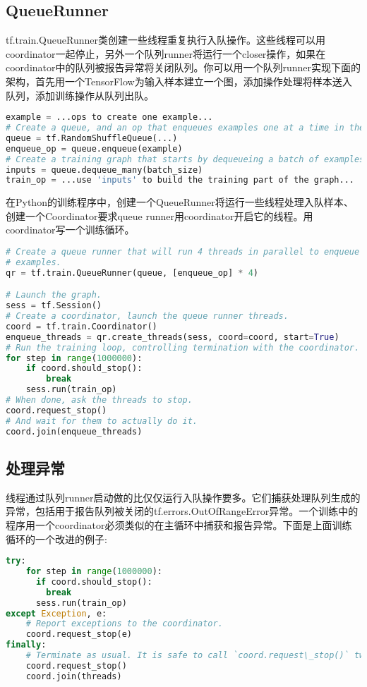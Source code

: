\subsection{QueueRunner}
tf.train.QueueRunner类创建一些线程重复执行入队操作。这些线程可以用coordinator一起停止，另外一个队列runner将运行一个closer操作，如果在coordinator中的队列被报告异常将关闭队列。你可以用一个队列runner实现下面的架构，首先用一个TensorFlow为输入样本建立一个图，添加操作处理将样本送入队列，添加训练操作从队列出队。
\begin{lstlisting}[language=Python]
example = ...ops to create one example...
# Create a queue, and an op that enqueues examples one at a time in the queue.
queue = tf.RandomShuffleQueue(...)
enqueue_op = queue.enqueue(example)
# Create a training graph that starts by dequeueing a batch of examples.
inputs = queue.dequeue_many(batch_size)
train_op = ...use 'inputs' to build the training part of the graph...	
\end{lstlisting}
在Python的训练程序中，创建一个QueueRunner将运行一些线程处理入队样本、创建一个Coordinator要求queue runner用coordinator开启它的线程。用coordinator写一个训练循环。
\begin{lstlisting}[language=Python]
# Create a queue runner that will run 4 threads in parallel to enqueue
# examples.
qr = tf.train.QueueRunner(queue, [enqueue_op] * 4)

# Launch the graph.
sess = tf.Session()
# Create a coordinator, launch the queue runner threads.
coord = tf.train.Coordinator()
enqueue_threads = qr.create_threads(sess, coord=coord, start=True)
# Run the training loop, controlling termination with the coordinator.
for step in range(1000000):
    if coord.should_stop():
        break
    sess.run(train_op)
# When done, ask the threads to stop.
coord.request_stop()
# And wait for them to actually do it.
coord.join(enqueue_threads)
\end{lstlisting}
\subsection{处理异常}
线程通过队列runner启动做的比仅仅运行入队操作要多。它们捕获处理队列生成的异常，包括用于报告队列被关闭的tf.errors.OutOfRangeError异常。一个训练中的程序用一个coordinator必须类似的在主循环中捕获和报告异常。下面是上面训练循环的一个改进的例子:
\begin{lstlisting}[language=Python]
try:
    for step in range(1000000):
      if coord.should_stop():
        break
      sess.run(train_op)
except Exception, e:
    # Report exceptions to the coordinator.
    coord.request_stop(e)
finally:
    # Terminate as usual. It is safe to call `coord.request\_stop()` twice.
    coord.request_stop()
    coord.join(threads)
\end{lstlisting}
